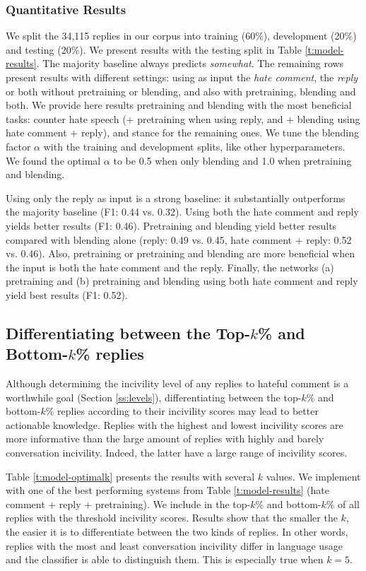 \documentclass[11pt]{article}
\begin{document}
	\subsubsection{Quantitative Results}
	We split the 34,115 replies in our corpus into training (60\%), development (20\%) and testing (20\%).
	We present results with the testing split in Table \ref{t:model-results}.
	The majority baseline always predicts \emph{somewhat}.
	The remaining rows present results with different settings:
	using as input the \emph{hate comment}, the \emph{reply} or both without pretraining or blending, and also with
	pretraining, blending and both.
	We provide here results pretraining and blending with the most beneficial tasks:
	counter hate speech (+ pretraining when using reply, and + blending using hate comment + reply),
	and stance for the remaining ones.
	We tune the blending factor $\alpha$  with the training and development splits, like other hyperparameters.
	We found the optimal $\alpha$ to be 0.5 when only blending and 1.0 when pretraining and blending. 
	
	Using only the reply as input is a strong baseline: it substantially outperforms the majority baseline (F1: 0.44 vs. 0.32).
	Using both the hate comment and reply yields better results (F1: 0.46).
	Pretraining and blending yield better results compared with blending alone (reply: 0.49 vs. 0.45, hate comment + reply: 0.52 vs. 0.46).
	Also, pretraining or pretraining and blending are more beneficial when the input is both the hate comment and the reply.
	Finally, the networks (a) pretraining and (b) pretraining and blending using both hate comment and reply yield best results (F1: 0.52).

	
	\subsection{Differentiating between the Top-$k$\% and Bottom-$k$\% replies}
	\label{ss:topbottom}
	Although determining the incivility level of any replies to hateful comment is a worthwhile goal (Section \ref{ss:levels}),
	differentiating between the top-$k$\% and bottom-$k$\% replies according to their incivility scores may lead to better actionable knowledge.
	Replies with the highest and lowest incivility scores are more informative than the large amount of replies with highly and barely conversation incivility.
	Indeed, the latter have a large range of incivility scores.
	
	Table \ref{t:model-optimalk} presents the results with several $k$ values.
	We implement with one of the best performing systems from Table \ref{t:model-results} (hate comment + reply + pretraining).
	We include in the top-$k$\% and bottom-$k$\% of all replies with the threshold incivility scores.
	Results show that the smaller the $k$, the easier it is to differentiate between the two kinds of replies.
	In other words, replies with the most and least conversation incivility differ in language usage and the classifier is able to distinguish them.
	This is especially true when $k=5$.
\end{document}
